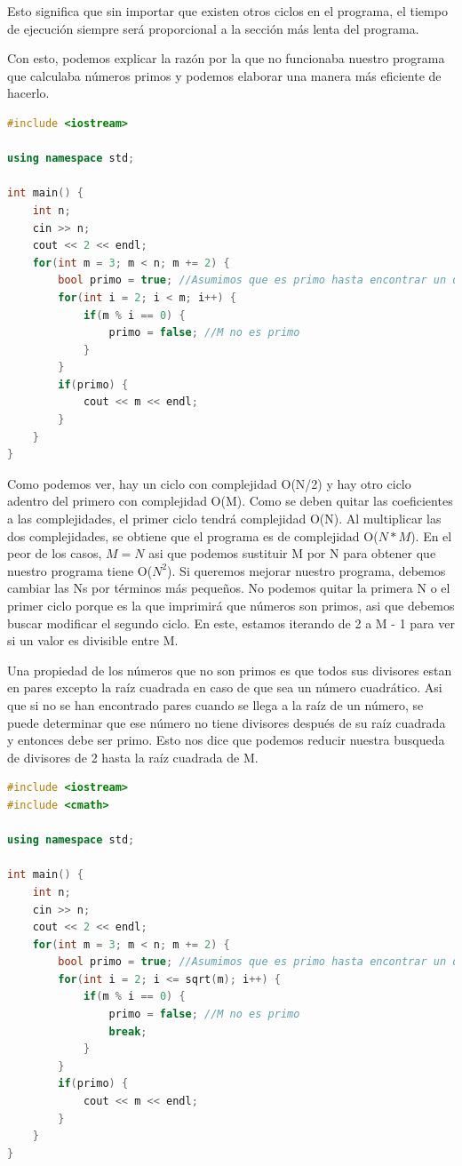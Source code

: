 \documentclass{article}
\begin{document}
Esto significa que sin importar que existen otros ciclos en el programa, el tiempo de ejecución siempre será proporcional a la sección más lenta del programa.

Con esto, podemos explicar la razón por la que no funcionaba nuestro programa que calculaba números primos y podemos elaborar una manera más eficiente de hacerlo.

\begin{lstlisting}[language=C++, title=¿Optimizando?]
#include <iostream>

using namespace std;

int main() {
	int n;
	cin >> n;
	cout << 2 << endl;
	for(int m = 3; m < n; m += 2) {
		bool primo = true; //Asumimos que es primo hasta encontrar un divisor
		for(int i = 2; i < m; i++) {
			if(m % i == 0) {
				primo = false; //M no es primo
			}
		}
		if(primo) {
			cout << m << endl;
		}
	}
}
\end{lstlisting}

Como podemos ver, hay un ciclo con complejidad O(N/2) y hay otro ciclo adentro del primero con complejidad O(M). Como se deben quitar las coeficientes a las complejidades, el primer ciclo tendrá complejidad O(N). Al multiplicar las dos complejidades, se obtiene que el programa es de complejidad O($N * M$). En el peor de los casos, $M = N$ asi que podemos sustituir M por N para obtener que nuestro programa tiene O($N^2$). Si queremos mejorar nuestro programa, debemos cambiar las Ns por términos más pequeños. No podemos quitar la primera N o el primer ciclo porque es la que imprimirá que números son primos, asi que debemos buscar modificar el segundo ciclo. En este, estamos iterando de 2 a M - 1 para ver si un valor es divisible entre M.

Una propiedad de los números que no son primos es que todos sus divisores estan en pares excepto la raíz cuadrada en caso de que sea un número cuadrático. Asi que si no se han encontrado pares cuando se llega a la raíz de un número, se puede determinar que ese número no tiene divisores después de su raíz cuadrada y entonces debe ser primo. Esto nos dice que podemos reducir nuestra busqueda de divisores de 2 hasta la raíz cuadrada de M.

\begin{lstlisting}[language=C++, title=Código optimizando]
#include <iostream>
#include <cmath>

using namespace std;

int main() {
	int n;
	cin >> n;
	cout << 2 << endl;
	for(int m = 3; m < n; m += 2) {
		bool primo = true; //Asumimos que es primo hasta encontrar un divisor
		for(int i = 2; i <= sqrt(m); i++) {
			if(m % i == 0) {
				primo = false; //M no es primo
				break;
			}
		}
		if(primo) {
			cout << m << endl;
		}
	}
}
\end{lstlisting}
\end{document}

